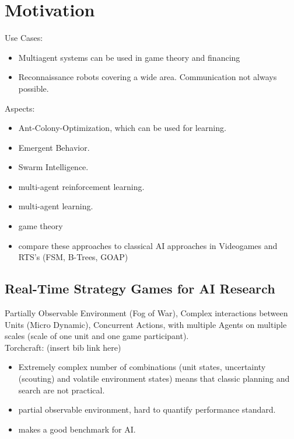 
\chapter{Motivation}
\label{ch:Motivation}

Use Cases:
\begin{itemize}[noitemsep,nolistsep]
	\item Multiagent systems can be used in game theory and financing
	\item Reconnaissance robots covering a wide area. Communication not always possible.
\end{itemize}
Aspects:
\begin{itemize}[noitemsep,nolistsep]
	\item Ant-Colony-Optimization, which can be used for learning.
	\item Emergent Behavior.
	\item Swarm Intelligence.
	\item multi-agent reinforcement learning.
	\item multi-agent learning.
	\item game theory
	\item compare these approaches to classical AI approaches in Videogames and RTS's (FSM, B-Trees, GOAP)
\end{itemize}


\section{Real-Time Strategy Games for AI Research}
\label{ch:Motivation:RTS4AI}
Partially Observable Environment (Fog of War), Complex interactions between Units (Micro Dynamic), Concurrent Actions, with multiple Agents on multiple scales (scale of one unit and one game participant).
\\
Torchcraft: (insert bib link here)
\begin{itemize}[noitemsep,nolistsep]
	\item Extremely complex number of combinations (unit states, uncertainty (scouting) and volatile environment states) means that classic planning and search are not practical. 
	\item partial observable environment, hard to quantify performance standard.
	\item makes a good benchmark for AI.
\end{itemize}


